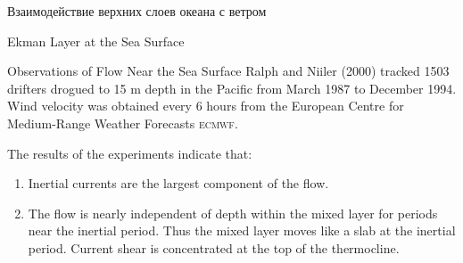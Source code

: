 \begin{chapter}{Взаимодействие верхних слоев океана с ветром}
\begin{section}{Ekman Layer at the Sea Surface}
\begin{paragraph}{Observations of Flow Near the Sea Surface}
Ralph and Niiler (2000) tracked 1503
drifters drogued to 15 m
depth in the Pacific from March 1987 to December 1994. Wind velocity
was obtained every 6 hours from the European Centre for Medium-Range
Weather Forecasts \textsc{ecmwf}.
%

The results of the experiments indicate that:
\begin{enumerate}
\item
Inertial currents are the largest component of the flow.

\item 
The flow is nearly independent of depth within the mixed
layer for periods near the inertial
period. Thus the mixed layer moves like a slab
at the inertial period. Current shear is concentrated at the top of
the thermocline.
%


\end{enumerate}
\end{paragraph}
\end{section}
\end{chapter}

